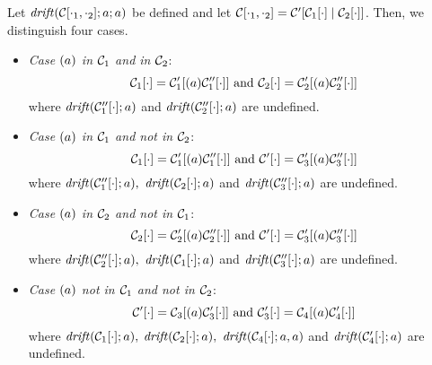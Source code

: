 \begin{proposition}{\label{prop:Cases_for_contexts}}

Let $\mathit {drift}(\mathcal{C}[\cdot_1, \cdot_2];a;a)$ be defined and let $\mathcal{C}[\cdot_1, \cdot_2]= \mathcal{C}'[\mathcal{C}_1[\cdot] \;|\; \mathcal{C}_2[\cdot]]$. Then, we distinguish four cases.
\begin{itemize}
\item \emph{Case $(a)$ in $\mathcal{C}_1$ and in $\mathcal{C}_2$}: 
\[\mathcal{C}_1[\cdot]=\mathcal{C}_1'[(a) \mathcal{C}_1''[\cdot]] \text{ and } \mathcal{C}_2[\cdot]=\mathcal{C}_2'[(a) \mathcal{C}_2''[\cdot]]
\]
where $\mathit {drift}(\mathcal{C}_1''[\cdot]; a)$ and $\mathit {drift}(\mathcal{C}_2''[\cdot]; a)$ are undefined.
%
\item \emph{Case $(a)$ in $\mathcal{C}_1$ and not in $\mathcal{C}_2$}: 
\[
\mathcal{C}_1[\cdot]=\mathcal{C}_1'[(a) \mathcal{C}_1''[\cdot]] \text{ and } \mathcal{C}'[\cdot]=\mathcal{C}_3'[(a)\mathcal{C}_3''[\cdot]]
\] 
where $\mathit {drift}(\mathcal{C}_1''[\cdot]; a),$  $\mathit {drift}(\mathcal{C}_2[\cdot]; a)$ and $\mathit {drift}(\mathcal{C}_3''[\cdot]; a)$ are undefined.
%
\item \emph{Case $(a)$ in $\mathcal{C}_2$ and not in $\mathcal{C}_1$}: 
\[
\mathcal{C}_2[\cdot]=\mathcal{C}_2'[(a) \mathcal{C}_2''[\cdot]] \text{ and } 
\mathcal{C}'[\cdot]=\mathcal{C}_3'[(a)\mathcal{C}_3''[\cdot]]
\] 
where $\mathit {drift}(\mathcal{C}_2''[\cdot]; a),$  $\mathit {drift}(\mathcal{C}_1[\cdot]; a)$ and $\mathit {drift}(\mathcal{C}_3''[\cdot]; a)$ are undefined.
%
\item \emph{Case $(a)$ not in $\mathcal{C}_1$ and not in $\mathcal{C}_2$}: 
\[
\mathcal{C}'[\cdot]=\mathcal{C}_3[(a) \mathcal{C}_3'[\cdot]] \text{ and } 
\mathcal{C}_3'[\cdot]=\mathcal{C}_4[(a) \mathcal{C}_4'[\cdot]]
\]
where $\mathit {drift}(\mathcal{C}_1[\cdot]; a),$ $\mathit {drift}(\mathcal{C}_2[\cdot]; a),$ $\mathit {drift}(\mathcal{C}_4[\cdot]; a, a)$ and 
 $\mathit {drift}(\mathcal{C}_4'[\cdot]; a)$ are undefined.
\end{itemize}


\end{proposition}
